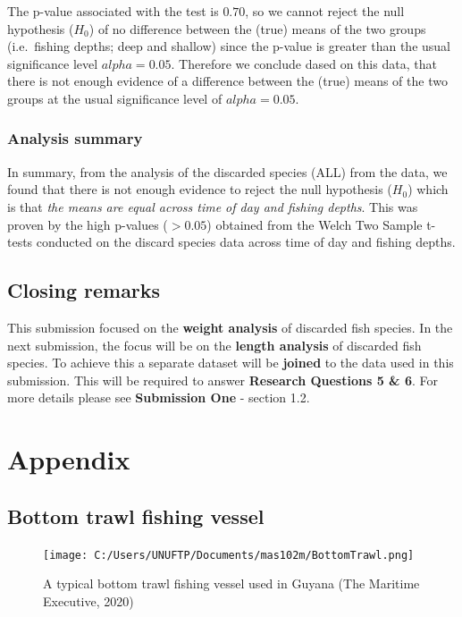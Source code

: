 \documentclass[
]{book}
\begin{document}
The p-value associated with the test is \(0.70\), so we cannot reject the null hypothesis (\(H_0\)) of no difference between the (true) means of the two groups (i.e.~fishing depths; deep and shallow) since the p-value is greater than the usual significance level \(alpha = 0.05\). Therefore we conclude dased on this data, that there is not enough evidence of a difference between the (true) means of the two groups at the usual significance level of \(alpha = 0.05\).

\hypertarget{analysis-summary}{%
\subsection{Analysis summary}\label{analysis-summary}}

In summary, from the analysis of the discarded species (ALL) from the data, we found that there is not enough evidence to reject the null hypothesis (\(H_0\)) which is that \emph{the means are equal across time of day and fishing depths}. This was proven by the high p-values (\(> 0.05\)) obtained from the Welch Two Sample t-tests conducted on the discard species data across time of day and fishing depths.

\hypertarget{closing-remarks}{%
\section{Closing remarks}\label{closing-remarks}}

This submission focused on the \textbf{weight analysis} of discarded fish species. In the next submission, the focus will be on the \textbf{length analysis} of discarded fish species. To achieve this a separate dataset will be \textbf{joined} to the data used in this submission. This will be required to answer \textbf{Research Questions 5 \& 6}. For more details please see \textbf{Submission One} - section 1.2.

\hypertarget{appendix}{%
\chapter{Appendix}\label{appendix}}

\hypertarget{bottom-trawl-fishing-vessel}{%
\section{Bottom trawl fishing vessel}\label{bottom-trawl-fishing-vessel}}

\begin{figure}
\centering
\texttt{[image: C:/Users/UNUFTP/Documents/mas102m/BottomTrawl.png]}
\caption{A typical bottom trawl fishing vessel used in Guyana (The Maritime Executive, 2020)}
\end{figure}
\end{document}
